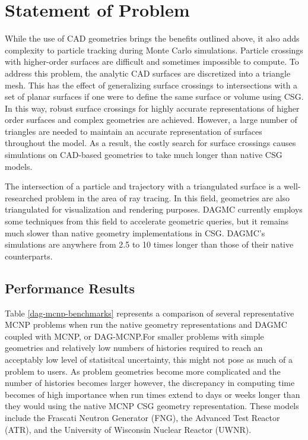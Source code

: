 \section{Statement of Problem}\label{sec:problem-statement}

While the use of CAD geometries brings the benefits outlined above, it also adds
complexity to particle tracking during Monte Carlo simulations. Particle
crossings with higher-order surfaces are difficult and sometimes impossible to
compute. To address this problem, the analytic CAD surfaces are
discretized into a triangle mesh. This has the effect of generalizing surface crossings to
intersections with a set of planar surfaces if one were to define the same
surface or volume using CSG. In this way, robust surface crossings for highly
accurate representations of higher order surfaces and complex geometries are
achieved. However, a large number of triangles are needed to maintain an
accurate representation of surfaces throughout the model. As a result, the
costly search for surface crossings causes simulations on CAD-based geometries
to take much longer than native CSG models.

The intersection of a particle and trajectory with a triangulated surface is a
well-researched problem in the area of ray tracing. In this field, geometries
are also triangulated for visualization and rendering purposes. DAGMC currently
employs some techniques from this field to accelerate geometric queries, but it
remains much slower than native geometry implementations in CSG. DAGMC's
simulations are anywhere from 2.5 to 10 times longer than those of their native
counterparts.

\subsection{Performance Results}%

Table \ref{dag-mcnp-benchmarks} represents a comparison of several
representative MCNP problems when run the native geometry representations and
DAGMC coupled with MCNP, or DAG-MCNP.For smaller problems with simple geometries
and relatively low numbers of histories required to reach an acceptably low
level of statisitcal uncertainty, this might not pose as much of a problem to
users. As problem geometries become more complicated and the number of histories
becomes larger however, the discrepancy in computing time becomes of high
importance when run times extend to days or weeks longer than they would using
the native MCNP CSG geometry representation. These models include the Frascati
Neutron Generator (FNG), the Advanced Test Reactor (ATR), and the University of
Wisconsin Nuclear Reactor (UWNR).

